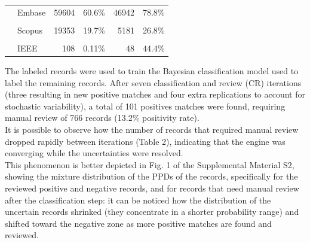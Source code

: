 \documentclass{article}
\begin{document}
\begin{table}[!h]
{\begin{tabular}[t]{llrlrl}
 & Embase & 59604 & 60.6\% & 46942 & 78.8\%\\
\cellcolor{gray!6}{} & \cellcolor{gray!6}{Pubmed} & \cellcolor{gray!6}{37278} & \cellcolor{gray!6}{37.9\%} & \cellcolor{gray!6}{21371} & \cellcolor{gray!6}{57.3\%}\\
\addlinespace
 & Scopus & 19353 & 19.7\% & 5181 & 26.8\%\\
\cellcolor{gray!6}{} & \cellcolor{gray!6}{WOS} & \cellcolor{gray!6}{14367} & \cellcolor{gray!6}{14.6\%} & \cellcolor{gray!6}{3175} & \cellcolor{gray!6}{22.1\%}\\
 & IEEE & 108 & 0.11\% & 48 & 44.4\%\\
\bottomrule
\end{tabular}}
\end{table}

The labeled records were used to train the Bayesian classification model
used to label the remaining records. After seven classification and
review (CR) iterations (three resulting in new positive matches and four
extra replications to account for stochastic variability), a total of
101 positives matches were found, requiring manual review of 766 records
(13.2\% positivity rate).\\
It is possible to observe how the number of records that required manual
review dropped rapidly between iterations (Table 2), indicating that the
engine was converging while the uncertainties were resolved.\\
This phenomenon is better depicted in Fig. 1 of the Supplemental
Material S2, showing the mixture distribution of the PPDs of the
records, specifically for the reviewed positive and negative records,
and for records that need manual review after the classification step:
it can be noticed how the distribution of the uncertain records shrinked
(they concentrate in a shorter probability range) and shifted toward the
negative zone as more positive matches are found and reviewed.
\end{document}
